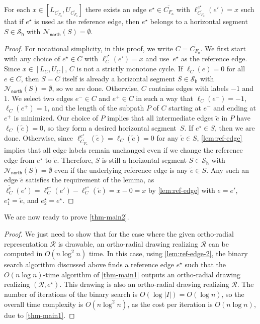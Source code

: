 \documentclass{theoretics}
\newcommand{\RR}{\mathcal{R}}
\newcommand{\FO}{F_\mathsf{o}}
\newcommand{\PH}{\mathcal{S}_\mathsf{h}}
\newcommand{\Nnorth}{\mathcal{N}_\mathsf{north}}
\newcommand{\eref}{e^\star}
\begin{document}
\begin{lemma}\label{lem:ref-edge-2}
For each  $x \in \left[L_{\overline{C_{\FO}}}, U_{\overline{C_{\FO}}}\right]$ there exists an edge $\eref \in \overline{C_{\FO}}$ with $\ell_{\overline{C_{\FO}}}^{\eref}(e') = x$ such that if $\eref$ is used as the reference edge, then $\eref$ belongs to a horizontal segment $S \in \PH$ with $\Nnorth(S) = \emptyset$.
\end{lemma}
\begin{proof}
For notational simplicity, in this proof, we write $C = \overline{C_{\FO}}$.
 We first start with any choice of  $\eref \in C$ with $\ell_C^{\eref}(e') = x$ and use~$\eref$ as the reference edge. Since $x \in \left[L_{C}, U_{C}\right]$, $C$ is not a strictly monotone cycle. If $\ell_C(e) = 0$ for all $e \in C$, then $S = C$ itself is already  a horizontal segment $S \in \PH$ with $\Nnorth(S) = \emptyset$, so we are done. Otherwise, $C$ contains edges with labels $-1$ and $1$. We select two edges $e^- \in C$  and $e^+ \in C$ in such a way that $\ell_C(e^-) = -1$, $\ell_C(e^+) = 1$, and the length of the subpath $P$ of $C$ starting at $e^-$ and ending at $e^+$ is minimized. Our choice of $P$ implies that all intermediate edges $\tilde{e}$ in $P$ have $\ell_C(\tilde{e}) = 0$, so they form a desired horizontal segment~$S$. If $\eref \in S$, then we are done. Otherwise,  since $\ell_{\overline{C_{\FO}}}^{\eref}(\tilde{e}) = \ell_{C}(\tilde{e}) = 0$ for any $\tilde{e} \in S$, \cref{lem:ref-edge} implies that all edge labels remain unchanged even if we change the reference edge from  $\eref$ to  $\tilde{e}$. Therefore, $S$ is still a horizontal segment $S \in \PH$ with $\Nnorth(S) = \emptyset$ even if the underlying reference edge is any $\tilde{e} \in S$. Any such an edge $\tilde{e}$ satisfies the requirement of the lemma, as  $\ell_C^{\tilde{e}}(e')=\ell_C^{\eref}(e')  - \ell_{C}^{\eref}(\tilde{e}) = x- 0 = x$ by \cref{lem:ref-edge} with $e=e'$, $\eref_1=\tilde{e}$, and $\eref_2 = \eref$.
\end{proof}



We are now ready to prove \cref{thm-main2}.

\thmtwo*

\begin{proof}%
We just need to show that for the case where the given  ortho-radial representation $\RR$ is drawable, an ortho-radial drawing realizing $\RR$ can be computed in $O(n \log^2 n)$ time.
In this case, using \cref{lem:ref-edge-2}, the  binary search algorithm discussed above finds a reference edge $\eref$ such that the $O(n \log n)$-time algorithm of \cref{thm-main1} outputs an ortho-radial drawing realizing $(\RR, \eref)$. This drawing is also an ortho-radial drawing realizing $\RR$. The number of iterations of the binary search is $O\left(\log |I|\right) = O(\log n)$, so the overall time complexity is $O(n \log^2 n)$, as the cost per iteration is $O(n \log n)$, due to \cref{thm-main1}.
\end{proof}
\end{document}

